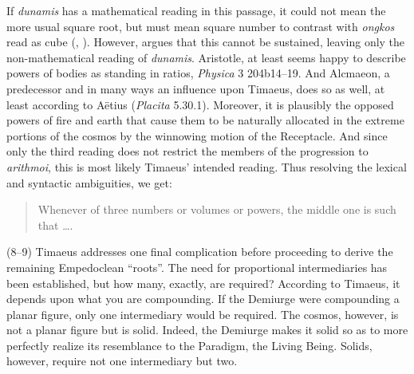 If \emph{dunamis} has a mathematical reading in this passage, it could not mean the more usual square root, but must mean square number to contrast with \emph{ongkos} read as cube (\citealt[97 n12]{Archer-Hind:1888qd}, \citealt[45--52]{Cornford:1935fk}). However, \citet{Prtichard:1990aa} argues that this cannot be sustained, leaving only the non-mathematical reading of \emph{dunamis}. Aristotle, at least seems happy to describe powers of bodies as standing in ratios, \emph{Physica} 3 204b14--19. And Alcmaeon, a predecessor and in many ways an influence upon Timaeus, does so as well, at least according to Aëtius (\emph{Placita} 5.30.1). Moreover, it is plausibly the opposed powers of fire and earth that cause them to be naturally allocated in the extreme portions of the cosmos by the winnowing motion of the Receptacle. And since only the third reading does not restrict the members of the progression to \emph{arithmoi}, this is most likely Timaeus' intended reading. Thus resolving the lexical and syntactic ambiguities, we get:
\begin{quote}
	Whenever of three numbers or volumes or powers, the middle one is such that \dots.
\end{quote}

(8--9) Timaeus addresses one final complication before proceeding to derive the remaining Empedoclean ``roots''. The need for proportional intermediaries has been established, but how many, exactly, are required? According to Timaeus, it depends upon what you are compounding. If the Demiurge were compounding a planar figure, only one intermediary would be required. The cosmos, however, is not a planar figure but is solid. Indeed, the Demiurge makes it solid so as to more perfectly realize its resemblance to the Paradigm, the Living Being. Solids, however, require not one intermediary but two. 

